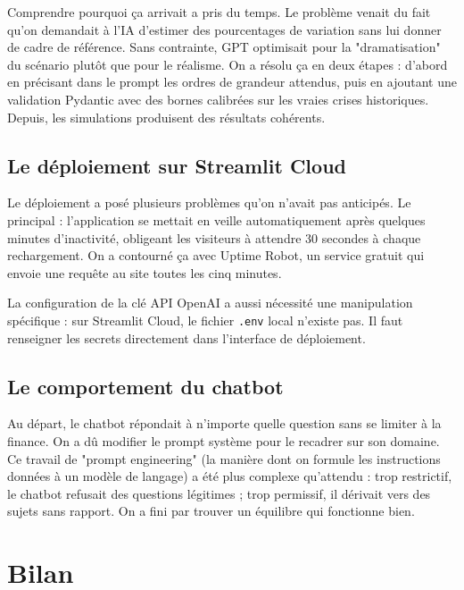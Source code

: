 \documentclass[a4paper, 12pt, twoside]{article}
\begin{document}
Comprendre pourquoi ça arrivait a pris du temps. Le problème venait du fait qu'on
demandait à l'IA d'estimer des pourcentages de variation sans lui donner de cadre de
référence. Sans contrainte, GPT optimisait pour la "dramatisation" du scénario plutôt
que pour le réalisme. On a résolu ça en deux étapes : d'abord en précisant dans le
prompt les ordres de grandeur attendus, puis en ajoutant une validation Pydantic avec
des bornes calibrées sur les vraies crises historiques. Depuis, les simulations
produisent des résultats cohérents.

\subsection{Le déploiement sur Streamlit Cloud}

Le déploiement a posé plusieurs problèmes qu'on n'avait pas anticipés. Le principal :
l'application se mettait en veille automatiquement après quelques minutes d'inactivité,
obligeant les visiteurs à attendre 30 secondes à chaque rechargement. On a contourné
ça avec Uptime Robot, un service gratuit qui envoie une requête au site toutes les
cinq minutes.

La configuration de la clé API OpenAI a aussi nécessité une manipulation spécifique :
sur Streamlit Cloud, le fichier \texttt{.env} local n'existe pas. Il faut renseigner
les secrets directement dans l'interface de déploiement.

\subsection{Le comportement du chatbot}

Au départ, le chatbot répondait à n'importe quelle question sans se limiter à la
finance. On a dû modifier le prompt système pour le recadrer sur son domaine. Ce
travail de "prompt engineering" (la manière dont on formule les instructions données
à un modèle de langage) a été plus complexe qu'attendu : trop restrictif, le chatbot
refusait des questions légitimes ; trop permissif, il dérivait vers des sujets sans
rapport. On a fini par trouver un équilibre qui fonctionne bien.

\newpage

\section{Bilan}
\end{document}
